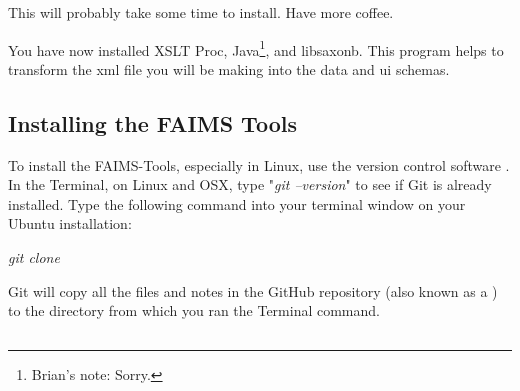 This will probably take some time to install. Have more coffee.

You have now installed XSLT Proc, Java\footnote{Brian's note: Sorry.}, and libsaxonb. This program helps to transform the xml file you will be making into the data and ui schemas.



\subsection[installing-the-faims-tools-1]{Installing the FAIMS Tools}

To install the FAIMS-Tools, especially in Linux, use the version control software \from[url9]. In the Terminal, on Linux and OSX, type "{\em git --version}" to see if Git is already installed. Type the following command into your terminal window on your Ubuntu installation:

{\em git clone \from[url10]}

Git will copy all the files and notes in the GitHub repository (also known as a ) to the directory from which you ran the Terminal command.

\subsection[section-3]{\crlf
}